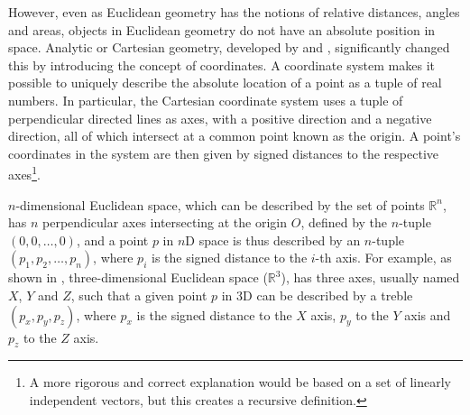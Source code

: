 However, even as Euclidean geometry has the notions of relative distances, angles and areas, objects in Euclidean geometry do not have an absolute position in space.
Analytic or Cartesian geometry, developed by \citet{Descartes37} and \citet{de-Fermat79}, significantly changed this by introducing the concept of coordinates.
A coordinate system makes it possible to uniquely describe the absolute location of a point as a tuple of real numbers.
In particular, the Cartesian coordinate system uses a tuple of perpendicular directed lines as axes, with a positive direction and a negative direction, all of which intersect at a common point known as the origin.
A point's coordinates in the system are then given by signed distances to the respective axes\footnote{A more rigorous and correct explanation would be based on a set of linearly independent vectors, but this creates a recursive definition.}.

$n$-dimensional Euclidean space, which can be described by the set of points $\mathbb{R}^n$, has $n$ perpendicular axes intersecting at the origin $O$, defined by the $n$-tuple $(0, 0, \ldots, 0)$, and a point $p$ in $n$D space is thus described by an $n$-tuple $(p_1, p_2, \ldots, p_n)$, where $p_i$ is the signed distance to the $i$-th axis.
For example, as shown in , three-dimensional Euclidean space ($\mathbb{R}^3$), has three axes, usually named $X$, $Y$ and $Z$, such that a given point $p$ in 3D can be described by a treble $(p_x,p_y,p_z)$, where $p_x$ is the signed distance to the $X$ axis, $p_y$ to the $Y$ axis and $p_z$ to the $Z$ axis.

